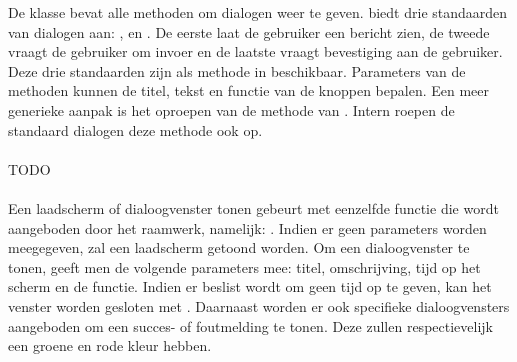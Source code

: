 De   klasse bevat alle methoden om dialogen weer te geven.
\st{} biedt drie standaarden van dialogen aan: ,  en .
De eerste laat de gebruiker een bericht zien,  de tweede vraagt de gebruiker om invoer en de laatste vraagt bevestiging aan de gebruiker.
Deze drie standaarden zijn als methode in  beschikbaar.
Parameters van de methoden kunnen de titel, tekst en functie van de knoppen bepalen.
Een meer generieke aanpak is het oproepen van de  methode van .
Intern roepen de standaard dialogen deze methode ook op.

\paragraph{\kendo}
TODO

\paragraph{\lungo}
Een laadscherm of dialoogvenster tonen gebeurt met eenzelfde functie die wordt aangeboden door het raamwerk, namelijk: .
Indien er geen parameters worden meegegeven, zal een laadscherm getoond worden.
Om een dialoogvenster te tonen, geeft men de volgende parameters mee: titel, omschrijving, tijd op het scherm en de  functie.
Indien er beslist wordt om geen tijd op te geven, kan het venster worden gesloten met .
Daarnaast worden er ook specifieke dialoogvensters aangeboden om een succes- of foutmelding te tonen.
Deze zullen respectievelijk een groene en rode kleur hebben.

